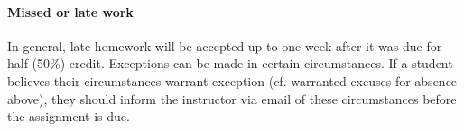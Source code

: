 \paragraph{Missed or late work}
In general, late homework will be accepted up to one week after it was due for half (50\%) credit. Exceptions can be made in certain circumstances. If a student believes their circumstances warrant exception (cf. warranted excuses for absence above), they should inform the instructor via email of these circumstances before the assignment is due.